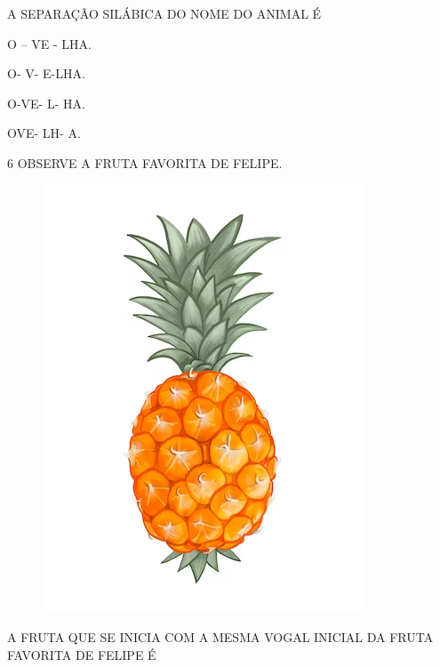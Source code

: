 A SEPARAÇÃO SILÁBICA DO NOME DO ANIMAL É

\begin{escolha}

\item O – VE - LHA.

\item O- V- E-LHA.

\item O-VE- L- HA.

\item OVE- LH- A.

\end{escolha}

\num{6} OBSERVE A FRUTA FAVORITA DE FELIPE.

\begin{figure}[H]
\centering
\includegraphics[width=\textwidth]{./media/image215.png}
\end{figure}

A FRUTA QUE SE INICIA COM A MESMA VOGAL INICIAL DA FRUTA FAVORITA DE FELIPE É

